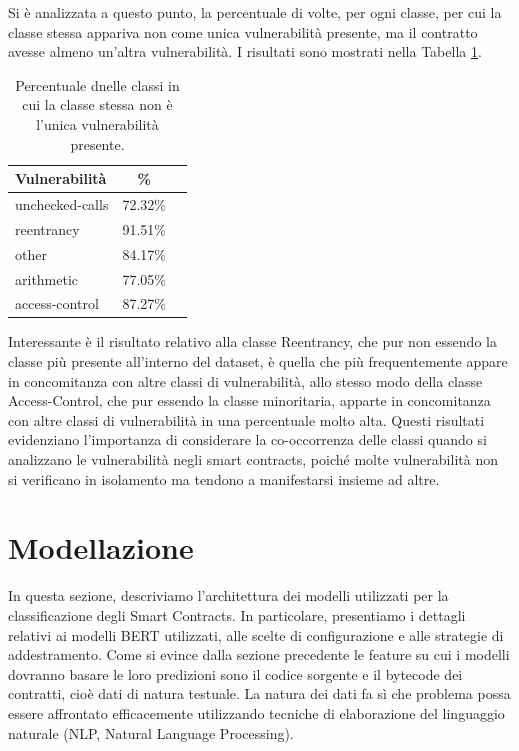 \documentclass[../../Thesis.tex]{subfiles}
\begin{document}
Si è analizzata a questo punto, la percentuale di volte, per ogni classe, per cui la classe stessa appariva non come unica vulnerabilità presente, ma il contratto avesse almeno un'altra vulnerabilità. I risultati sono mostrati nella Tabella \ref{tab:multi_vuln}.

\begin{table}[h!]
    \centering
    \begin{tabular}{|l|c|c|}
        \hline
        \textbf{Vulnerabilità} & \textbf{\%} \\
        \hline
        unchecked-calls  & 72.32\% \\
        reentrancy  & 91.51\% \\
        other  & 84.17\% \\
        arithmetic  & 77.05\% \\
        access-control  & 87.27\% \\

        \hline
    \end{tabular}
    \caption{Percentuale dnelle classi in cui la classe stessa non è l'unica vulnerabilità presente.}
    \label{tab:multi_vuln}
\end{table}
Interessante è il risultato relativo alla classe Reentrancy, che pur non essendo la classe più presente all'interno del dataset, è quella che più frequentemente appare in concomitanza con altre classi di vulnerabilità, allo stesso modo della classe Access-Control, che pur essendo la classe minoritaria, apparte in concomitanza con altre classi di vulnerabilità in una percentuale molto alta.
Questi risultati evidenziano l'importanza di considerare la co-occorrenza delle classi quando si analizzano le vulnerabilità negli smart contracts, poiché molte vulnerabilità non si verificano in isolamento ma tendono a manifestarsi insieme ad altre.


\section{Modellazione}
In questa sezione, descriviamo l'architettura dei modelli utilizzati per la classificazione degli Smart Contracts. In particolare, presentiamo i dettagli relativi ai modelli BERT utilizzati, alle scelte di configurazione e alle strategie di addestramento.
Come si evince dalla sezione precedente le feature su cui i modelli dovranno basare le loro predizioni sono il codice sorgente e il bytecode dei contratti, cioè dati di natura testuale. La natura dei dati fa sì che problema possa essere affrontato efficacemente utilizzando tecniche di elaborazione del linguaggio naturale (NLP, Natural Language Processing).
\end{document}
